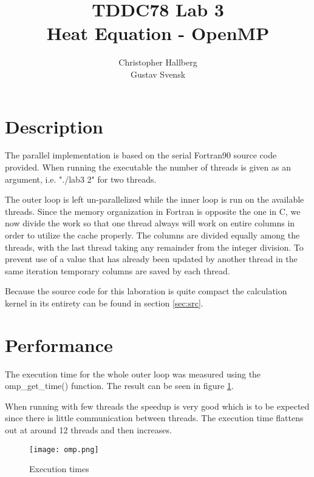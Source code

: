 \documentclass[a4paper, 12pt]{article}
\begin{document}
\title{TDDC78 Lab 3\\
        Heat Equation - OpenMP}
\author{Christopher Hallberg \\
        Gustav Svensk}
\maketitle

\thispagestyle{empty}

\newpage
\setcounter{page}{1}
\tableofcontents
\newpage

\section{Description}
The parallel implementation is based on the serial Fortran90 source code
provided. When running the executable the number of threads is given as
an argument, i.e. "./lab3 2" for two threads.

The outer loop is left un-parallelized while the inner loop is run on the
available threads. Since the memory organization in Fortran is opposite the one
in C, we now divide the work so that one thread always will work on entire
columns in order to utilize the cache properly. The columns are divided equally
among the threads, with the last thread taking any remainder from the integer
division. To prevent use of a value that has already been updated by another
thread in the same iteration temporary columns are saved by each thread.

Because the source code for this laboration is quite compact the
calculation kernel in its entirety can be found in section \ref{sec:src}.

\section{Performance}
The execution time for the whole outer loop was measured using the omp\_get\_time() function.
The result can be seen in figure \ref{fig:omp}.

When running with few threads the speedup is very good which is to be expected
since there is little communication between threads. The execution time flattens
out at around 12 threads and then increases.


\begin{figure}[h]
        \centering
        \texttt{[image: omp.png]}
        \caption{Execution times}
        \label{fig:omp}
\end{figure}
\end{document}
